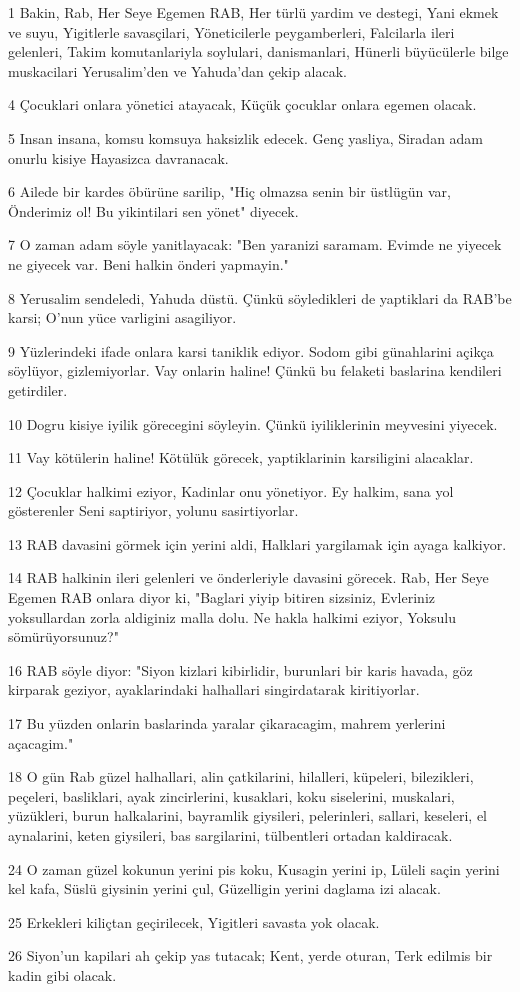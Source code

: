 \par 1 Bakin, Rab, Her Seye Egemen RAB, Her türlü yardim ve destegi, Yani ekmek ve suyu, Yigitlerle savasçilari, Yöneticilerle peygamberleri, Falcilarla ileri gelenleri, Takim komutanlariyla soylulari, danismanlari, Hünerli büyücülerle bilge muskacilari Yerusalim'den ve Yahuda'dan çekip alacak.
\par 4 Çocuklari onlara yönetici atayacak, Küçük çocuklar onlara egemen olacak.
\par 5 Insan insana, komsu komsuya haksizlik edecek. Genç yasliya, Siradan adam onurlu kisiye Hayasizca davranacak.
\par 6 Ailede bir kardes öbürüne sarilip, "Hiç olmazsa senin bir üstlügün var, Önderimiz ol! Bu yikintilari sen yönet" diyecek.
\par 7 O zaman adam söyle yanitlayacak: "Ben yaranizi saramam. Evimde ne yiyecek ne giyecek var. Beni halkin önderi yapmayin."
\par 8 Yerusalim sendeledi, Yahuda düstü. Çünkü söyledikleri de yaptiklari da RAB'be karsi; O'nun yüce varligini asagiliyor.
\par 9 Yüzlerindeki ifade onlara karsi taniklik ediyor. Sodom gibi günahlarini açikça söylüyor, gizlemiyorlar. Vay onlarin haline! Çünkü bu felaketi baslarina kendileri getirdiler.
\par 10 Dogru kisiye iyilik görecegini söyleyin. Çünkü iyiliklerinin meyvesini yiyecek.
\par 11 Vay kötülerin haline! Kötülük görecek, yaptiklarinin karsiligini alacaklar.
\par 12 Çocuklar halkimi eziyor, Kadinlar onu yönetiyor. Ey halkim, sana yol gösterenler Seni saptiriyor, yolunu sasirtiyorlar.
\par 13 RAB davasini görmek için yerini aldi, Halklari yargilamak için ayaga kalkiyor.
\par 14 RAB halkinin ileri gelenleri ve önderleriyle davasini görecek. Rab, Her Seye Egemen RAB onlara diyor ki, "Baglari yiyip bitiren sizsiniz, Evleriniz yoksullardan zorla aldiginiz malla dolu. Ne hakla halkimi eziyor, Yoksulu sömürüyorsunuz?"
\par 16 RAB söyle diyor: "Siyon kizlari kibirlidir, burunlari bir karis havada, göz kirparak geziyor, ayaklarindaki halhallari singirdatarak kiritiyorlar.
\par 17 Bu yüzden onlarin baslarinda yaralar çikaracagim, mahrem yerlerini açacagim."
\par 18 O gün Rab güzel halhallari, alin çatkilarini, hilalleri, küpeleri, bilezikleri, peçeleri, basliklari, ayak zincirlerini, kusaklari, koku siselerini, muskalari, yüzükleri, burun halkalarini, bayramlik giysileri, pelerinleri, sallari, keseleri, el aynalarini, keten giysileri, bas sargilarini, tülbentleri ortadan kaldiracak.
\par 24 O zaman güzel kokunun yerini pis koku, Kusagin yerini ip, Lüleli saçin yerini kel kafa, Süslü giysinin yerini çul, Güzelligin yerini daglama izi alacak.
\par 25 Erkekleri kiliçtan geçirilecek, Yigitleri savasta yok olacak.
\par 26 Siyon'un kapilari ah çekip yas tutacak; Kent, yerde oturan, Terk edilmis bir kadin gibi olacak.

